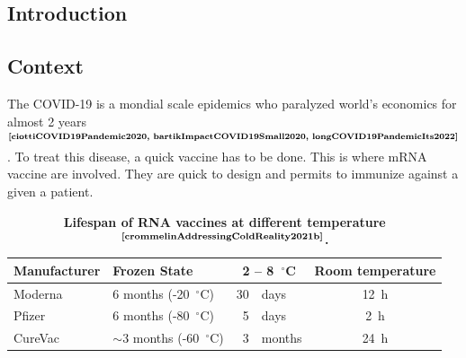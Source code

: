 \documentclass[12pt, oneside, a4paper]{report}
\newcommand{\p}[1]{$^\text{#1}$}
\newcommand{\Cite}[1]{\p{\textbf{\cite{#1}}}}
\begin{document}
\vspace{2ex}

\begin{multicols}{2}
\section{Introduction}
\subsection{Context}
The COVID-19 is a mondial scale epidemics who paralyzed world's economics for almost 2 years\Cite{ciottiCOVID19Pandemic2020, bartikImpactCOVID19Small2020, longCOVID19PandemicIts2022}. To treat this disease, a quick vaccine has to be done. This is where mRNA vaccine are involved. They are quick to design and permits to immunize against a given a patient.

\begin{table}[tb]
    \centering
    \begin{minipage}{10.86cm}
        \caption{\textbf{Lifespan of RNA vaccines at different temperature\Cite{crommelinAddressingColdReality2021b}.  
            \label{t:manufacturerFrozenRoomtemp} \vspace{-1em}}}
    \end{minipage}

    \begin{tabular}{llrlc}
        \toprule
        \bfseries Manufacturer  & \bfseries \phantom{$\sim$}Frozen State        & \multicolumn{2}{c}{\bfseries 2 -- 8~$^{\circ}$C}  &  \bfseries Room temperature\\
        \midrule
        Moderna                 & \phantom{$\sim$}6 months (-20~$^{\circ}$C)    & 30 & days                       & 12~h\\
        Pfizer                  & \phantom{$\sim$}6 months (-80~$^{\circ}$C)    & 5  & days                        & \phantom{0}2~h\\
        CureVac                 & $\sim$3 months (-60~$^{\circ}$C)              & 3  & months                      & 24~h\\
        \bottomrule
    \end{tabular}
\end{table}


\end{multicols}
\end{document}
